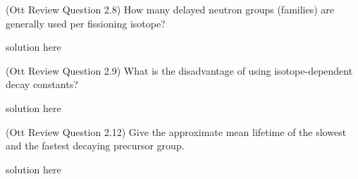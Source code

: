 \documentclass[11pt,addpoints,answers]{exam}
\begin{document}
\begin{questions}
        \question[10] (Ott Review Question 2.8)
        How many delayed neutron groups (families) are generally used per 
        fissioning isotope?
                \begin{solution}
                        solution here
                \end{solution}

        \question[10] (Ott Review Question 2.9)
        What is the disadvantage of using isotope-dependent decay constants?
                \begin{solution}
                        solution here
                \end{solution}

        \question[10] (Ott Review Question 2.12)
        Give the approximate mean lifetime of the slowest and the fastest 
        decaying precursor group.
                \begin{solution}
                        solution here
                \end{solution}

\end{questions}



%
%
\end{document}
